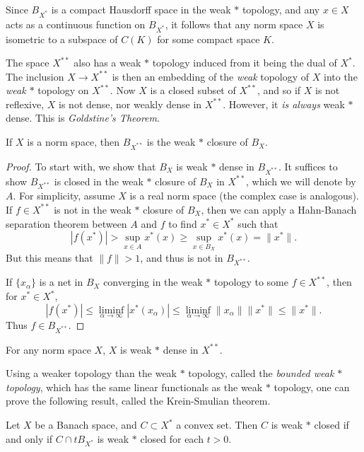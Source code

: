 Since $B_{X^*}$ is a compact Hausdorff space in the weak $*$ topology, and any $x \in X$ acts as a continuous function on $B_{X^*}$, it follows that any norm space $X$ is isometric to a subspace of $C(K)$ for some compact space $K$.

The space $X^{**}$ also has a weak $*$ topology induced from it being the dual of $X^*$. The inclusion $X \to X^{**}$ is then an embedding of the \emph{weak} topology of $X$ into the \emph{weak $*$} topology on $X^{**}$. Now $X$ is a closed subset of $X^{**}$, and so if $X$ is not reflexive, $X$ is not dense, nor weakly dense in $X^{**}$. However, it \emph{is always} weak $*$ dense. This is \emph{Goldstine's Theorem}.

\begin{theorem}
    If $X$ is a norm space, then $B_{X^{**}}$ is the weak $*$ closure of $B_X$.
\end{theorem}
\begin{proof}
    To start with, we show that $B_X$ is weak $*$ dense in $B_{X^{**}}$. It suffices to show $B_{X^{**}}$ is closed in the weak $*$ closure of $B_X$ in $X^{**}$, which we will denote by $A$. For simplicity, assume $X$ is a real norm space (the complex case is analogous). If $f \in X^{**}$ is not in the weak $*$ closure of $B_X$, then we can apply a Hahn-Banach separation theorem between $A$ and $f$ to find $x^* \in X^*$ such that 
    \[ |f(x^*)| > \sup_{x \in A} x^*(x) \geq \sup_{x \in B_X} x^*(x) = \| x^* \|. \]
    But this means that $\| f \| > 1$, and thus is not in $B_{X^{**}}$.

    If $\{ x_\alpha \}$ is a net in $B_X$ converging in the weak $*$ topology to some $f \in X^{**}$, then for $x^* \in X^*$,
    \[ |f(x^*)| \leq \liminf_{\alpha \to \infty} |x^*(x_\alpha)| \leq \liminf_{\alpha \to \infty} \| x_\alpha \| \| x^* \| \leq \| x^* \|. \]
    Thus $f \in B_{X^{**}}$.
\end{proof}

\begin{corollary}
    For any norm space $X$, $X$ is weak $*$ dense in $X^{**}$.
\end{corollary}

Using a weaker topology than the weak $*$ topology, called the \emph{bounded weak $*$ topology}, which has the same linear functionals as the weak $*$ topology, one can prove the following result, called the Krein-Smulian theorem.

\begin{theorem}
    Let $X$ be a Banach space, and $C \subset X^*$ a convex set. Then $C$ is weak $*$ closed if and only if $C \cap t B_{X^*}$ is weak $*$ closed for each $t > 0$.
\end{theorem}

